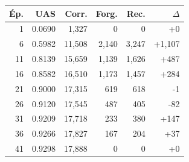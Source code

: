 \begin{table}[ht]
\begin{minipage}[t]{0.42\linewidth}
\centering\tiny
\begin{tabular}{rrrrrr}
\toprule
\textbf{Ép.} & \textbf{UAS} & \textbf{Corr.} & \textbf{Forg.} & \textbf{Rec.} & \textbf{$\Delta$} \\
\midrule
1 & 0.0690 & 1,327 & 0 & 0 & +0 \\
6 & 0.5982 & 11,508 & 2,140 & 3,247 & +1,107 \\
11 & 0.8139 & 15,659 & 1,139 & 1,626 & +487 \\
16 & 0.8582 & 16,510 & 1,173 & 1,457 & +284 \\
21 & 0.9000 & 17,315 & 619 & 618 & -1 \\
26 & 0.9120 & 17,545 & 487 & 405 & -82 \\
31 & 0.9209 & 17,718 & 233 & 380 & +147 \\
36 & 0.9266 & 17,827 & 167 & 204 & +37 \\
41 & 0.9298 & 17,888 & 0 & 0 & +0 \\
\bottomrule
\end{tabular}
\end{minipage}
\end{table}
